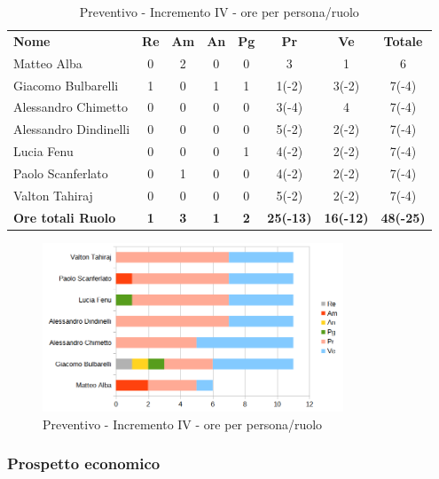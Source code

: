 \begin{table} [h!]
	\begin{center}
		\begin{tabular} { m{3.5cm} c c c c c c c }
			\rowcolor{lightgray}
			\textbf{Nome} & \textbf{Re} & \textbf{Am} & \textbf{An} & \textbf{Pg} & \textbf{Pr} & \textbf{Ve} & \textbf{Totale} \\
			Matteo Alba & 0 & 2 & 0 & 0 & 3 & 1 & 6 \\
			Giacomo Bulbarelli & 1 & 0 & 1 & 1 & 1(-2) & 3(-2)& 7(-4) \\
			Alessandro Chimetto & 0 & 0 & 0 & 0 & 3(-4) & 4 & 7(-4) \\
			Alessandro Dindinelli & 0 & 0 & 0 & 0 & 5(-2) & 2(-2) & 7(-4)\\
			Lucia Fenu & 0 & 0 & 0 & 1 & 4(-2) & 2(-2) & 7(-4) \\
			Paolo Scanferlato & 0 & 1 & 0 & 0 & 4(-2) & 2(-2)& 7(-4) \\
			Valton Tahiraj & 0 & 0 & 0 & 0 & 5(-2) & 2(-2)& 7(-4) \\
			\textbf{Ore totali Ruolo} & \textbf{1} & \textbf{3} & \textbf{1} & \textbf{2} & \textbf{25(-13)}& \textbf{16(-12)} & \textbf{48(-25)}
		\end{tabular}
		\caption{Preventivo - Incremento IV - ore per persona/ruolo}
	\end{center}
\end{table}
\begin{figure} [h!]
	\centering
	\includegraphics[width=0.8\textwidth]{res/img/grafici/consuntivo-barre- incremento4.png}
	\caption{Preventivo - Incremento IV - ore per persona/ruolo} 
\end{figure}

\newpage
\subsubsection{Prospetto economico}

